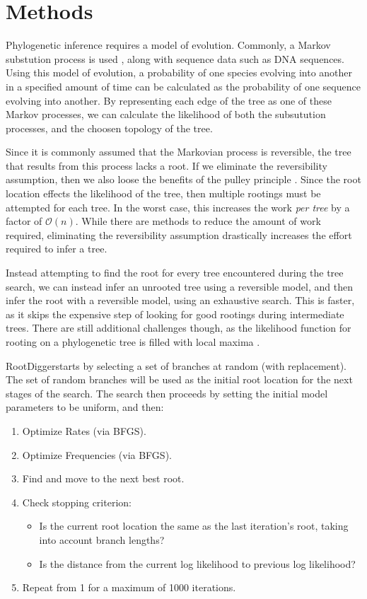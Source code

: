 \documentclass{article}
\newcommand{\RootDigger}{RootDigger}
\begin{document}
\section{Methods}

Phylogenetic inference requires a model of evolution. Commonly, a Markov
substution process is used \cite{yang_computational_2006}, along with sequence
data such as DNA sequences.  Using this model of evolution, a probability of one
species evolving into another in a specified amount of time can be calculated as
the probability of one sequence evolving into another. By representing each edge
of the tree as one of these Markov processes, we can calculate the likelihood of
both the subsutution processes, and the choosen topology of the tree.

Since it is commonly assumed that the Markovian process is reversible, the tree
that results from this process lacks a root. If we eliminate the reversibility
assumption, then we also loose the benefits of the pulley principle
\cite{felsenstein_evolutionary_1981}. Since the root location effects the
likelihood of the tree, then multiple rootings must be attempted for each tree.
In the worst case, this increases the work {\em per tree} by a factor of
$\mathcal{O}(n)$. While there are methods to reduce the amount of work required,
eliminating the reversibility assumption drastically increases the effort
required to infer a tree.

Instead attempting to find the root for every tree encountered during the tree
search, we can instead infer an unrooted tree using a reversible model, and then
infer the root with a reversible model, using an exhaustive search.
This is faster, as it skips the expensive step of looking for good rootings
during intermediate trees. There are still additional challenges though, as the
likelihood function for rooting on a phylogenetic tree is filled with local
maxima \cite{huelsenbeck_inferring_2002}.

\RootDigger starts by selecting a set of branches at random (with replacement).
The set of random branches will be used as the initial root location for the
next stages of the search. The search then proceeds by setting the initial model
parameters to be uniform, and then:

\begin{enumerate}
  \item Optimize Rates (via BFGS).
  \item Optimize Frequencies (via BFGS).
  \item Find and move to the next best root.
  \item Check stopping criterion:
        \begin{itemize}
          \item Is the current root location the same as the last iteration's root, taking
                into account branch lengths?
          \item Is the distance from the current log likelihood to previous log
                likelihood?
        \end{itemize}
  \item Repeat from 1 for a maximum of 1000 iterations.
\end{enumerate}
\end{document}
